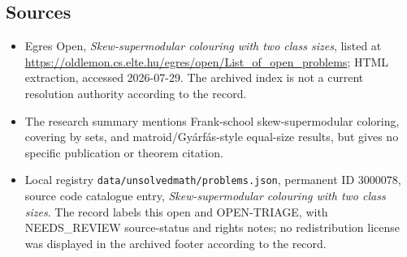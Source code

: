 \documentclass[11pt]{article}
\begin{document}
\subsection{Sources}
\begin{itemize}
\item Egres Open, \emph{Skew-supermodular colouring with two class sizes}, listed at \url{https://oldlemon.cs.elte.hu/egres/open/List_of_open_problems}; HTML extraction, accessed 2026-07-29. The archived index is not a current resolution authority according to the record.
\item The research summary mentions Frank-school skew-supermodular coloring, covering by sets, and matroid/Gy\'arf\'as-style equal-size results, but gives no specific publication or theorem citation.
\item Local registry \texttt{data/unsolvedmath/problems.json}, permanent ID $3000078$, source code catalogue entry, \emph{Skew-supermodular colouring with two class sizes}. The record labels this open and OPEN-TRIAGE, with NEEDS\_REVIEW source-status and rights notes; no redistribution license was displayed in the archived footer according to the record.
\end{itemize}
\end{document}
